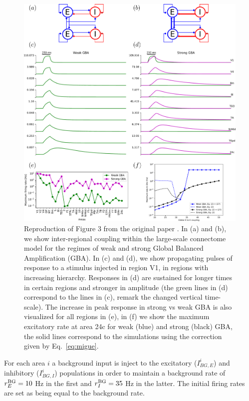 \begin{figure}[!hb]
 \centering
 \includegraphics[scale=0.4]{figures/fig3.pdf}
 \caption{Reproduction of Figure 3 from the original paper \cite{joglekar2018inter}. In (a) and (b), we show inter-regional coupling within the large-scale connectome model for the regimes of weak and strong Global Balanced Amplification (GBA). In (c) and (d), we show propagating pulses of response to a stimulus injected in region V1, in regions with increasing hierarchy. Responses in (d) are sustained for longer times in certain regions and stronger in amplitude (the green lines in (d) correspond to the lines in (c), remark the changed vertical time-scale). The increase in peak response in strong vs weak GBA is also visualized for all regions in (e), in (f) we show the maximum excitatory rate at area 24c for weak (blue) and strong (black) GBA, the solid lines correspond to the simulations using the correction given by Eq.~\ref{eq:migue}.}\label{fig:fig2}
\end{figure}

For each area $i$ a background input is inject to the excitatory ($I_{BG,E}^{i}$) and inhibitory ($I_{BG,I}^{i}$)  populations in order to maintain a background rate of $r_E^{\rm BG} = 10$ Hz in the first and $r_I^{\rm BG} = 35$ Hz in the latter. The initial firing rates are set as being equal to the background rate.

